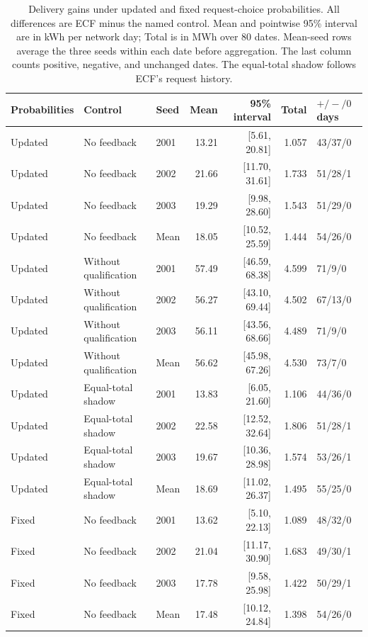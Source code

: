 \documentclass[11pt]{article}
\begin{document}
\begin{table}[!htbp]
\centering
\caption{Delivery gains under updated and fixed request-choice probabilities. All differences are ECF minus the named control. Mean and pointwise 95\% interval are in kWh per network day; Total is in MWh over 80 dates. Mean-seed rows average the three seeds within each date before aggregation. The last column counts positive, negative, and unchanged dates. The equal-total shadow follows ECF's request history.}
\label{tab:supp_adapt_contrasts}
\small
\begin{tabular}{@{}lllrrrl@{}}
\toprule
Probabilities & Control & Seed & Mean & 95\% interval & Total & $+/-/0$ days \\
\midrule
Updated & No feedback & 2001 & 13.21 & [5.61, 20.81] & 1.057 & 43/37/0 \\
Updated & No feedback & 2002 & 21.66 & [11.70, 31.61] & 1.733 & 51/28/1 \\
Updated & No feedback & 2003 & 19.29 & [9.98, 28.60] & 1.543 & 51/29/0 \\
Updated & No feedback & Mean & 18.05 & [10.52, 25.59] & 1.444 & 54/26/0 \\
Updated & Without qualification & 2001 & 57.49 & [46.59, 68.38] & 4.599 & 71/9/0 \\
Updated & Without qualification & 2002 & 56.27 & [43.10, 69.44] & 4.502 & 67/13/0 \\
Updated & Without qualification & 2003 & 56.11 & [43.56, 68.66] & 4.489 & 71/9/0 \\
Updated & Without qualification & Mean & 56.62 & [45.98, 67.26] & 4.530 & 73/7/0 \\
Updated & Equal-total shadow & 2001 & 13.83 & [6.05, 21.60] & 1.106 & 44/36/0 \\
Updated & Equal-total shadow & 2002 & 22.58 & [12.52, 32.64] & 1.806 & 51/28/1 \\
Updated & Equal-total shadow & 2003 & 19.67 & [10.36, 28.98] & 1.574 & 53/26/1 \\
Updated & Equal-total shadow & Mean & 18.69 & [11.02, 26.37] & 1.495 & 55/25/0 \\
Fixed & No feedback & 2001 & 13.62 & [5.10, 22.13] & 1.089 & 48/32/0 \\
Fixed & No feedback & 2002 & 21.04 & [11.17, 30.90] & 1.683 & 49/30/1 \\
Fixed & No feedback & 2003 & 17.78 & [9.58, 25.98] & 1.422 & 50/29/1 \\
Fixed & No feedback & Mean & 17.48 & [10.12, 24.84] & 1.398 & 54/26/0 \\

\end{tabular}
\end{table}
\end{document}
